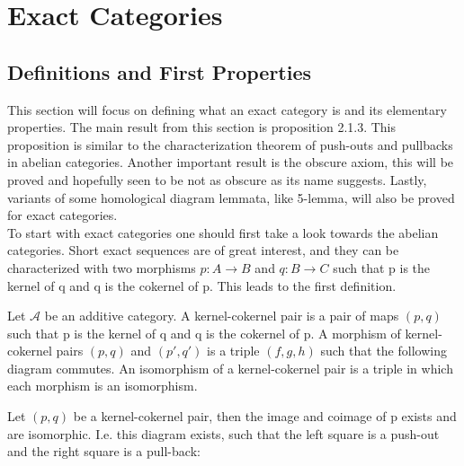 \chapter{Exact Categories}

\section{Definitions and First Properties}

    This section will focus on defining what an exact category is and its elementary properties. The main result from this section is proposition 2.1.3. This proposition is similar to the characterization theorem of push-outs and pullbacks in abelian categories. Another important result is the obscure axiom, this will be proved and hopefully seen to be not as obscure as its name suggests. Lastly, variants of some homological diagram lemmata, like 5-lemma, will also be proved for exact categories. \\

    To start with exact categories one should first take a look towards the abelian categories. Short exact sequences are of great interest, and they can be characterized with two morphisms $p:A\rightarrow B$ and $q:B\rightarrow C$ such that p is the kernel of q and q is the cokernel of p. This leads to the first definition.

    \begin{definition}
        Let $\mathcal{A}$ be an additive category. A kernel-cokernel pair is a pair of maps $(p,q)$ such that p is the kernel of q and q is the cokernel of p. A morphism of kernel-cokernel pairs $(p,q)$ and $(p',q')$ is a triple $(f,g,h)$ such that the following diagram commutes. An isomorphism of a kernel-cokernel pair is a triple in which each morphism is an isomorphism.
        \begin{center}
        \end{center}
    \end{definition}

    \begin{lemma}
        Let $(p,q)$ be a kernel-cokernel pair, then the image and coimage of p exists and are isomorphic. I.e. this diagram exists, such that the left square is a push-out and the right square is a pull-back:
        \begin{center}
        \end{center}
    \end{lemma}
    
